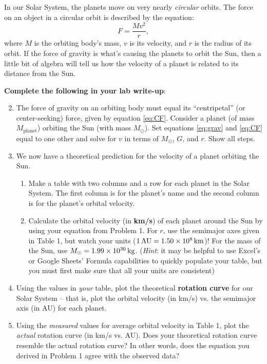 \documentclass[11pt]{article}%
\begin{document}
In our Solar System, the planets move on very nearly \emph{circular} orbits. The force on an object in a circular orbit is described by the equation:
\begin{equation} \label{eq:CF}
F = \frac{M v^2}{r},
\end{equation}
where $M$ is the orbiting body's mass, $v$ is its velocity, and $r$ is the radius of its orbit. If the force of gravity is what's causing the planets to orbit the Sun, then a little bit of algebra will tell us how the velocity of a planet is related to its distance from the Sun.

\textbf{Complete the following in your lab write-up}:

\begin{enumerate}
\setcounter{enumi}{1}
    \item The force of gravity on an orbiting body must equal its ``centripetal'' (or center-seeking) force, given by equation \ref{eq:CF}. Consider a planet (of mass $M_{\textrm{planet}}$) orbiting the Sun (with mass $M_\odot$). Set equations \ref{eq:grav} and \ref{eq:CF} equal to one other and solve for $v$ in terms of $M_{\odot}$, $G$, and $r$. Show all steps.
    
    \item We now have a theoretical prediction for the velocity of a planet orbiting the Sun.
    \begin{enumerate}
        \item Make a table with two columns and a row for each planet in the Solar System. The first column is for the planet's name and the second column is for the planet's orbital velocity. 
        
        \item Calculate the orbital velocity (in \textbf{km/s}) of each planet around the Sun by using your equation from Problem 1. For $r$, use the semimajor axes given in Table 1, but watch your units ($1 \, {\rm AU} = 1.50 \times 10^8 \, {\rm km}$)! For the mass of the Sun, use $M_\odot = 1.99 \times 10^{30} \, {\rm kg}$. (\emph{Hint}: it may be helpful to use Excel's or Google Sheets' Formula capabilities to quickly populate your table, but you must first make sure that all your units are consistent)
    \end{enumerate}
    
    \item Using the values in \emph{your} table, plot the theoretical \textbf{rotation curve} for our Solar System -- that is, plot the orbital velocity (in km/s) vs. the semimajor axis (in AU) for each planet. 
    
    \item Using the \emph{measured} values for average orbital velocity in Table 1, plot the \emph{actual} rotation curve (in km/s vs. AU). Does your theoretical rotation curve resemble the actual rotation curve? In other words, does the equation you derived in Problem 1 agree with the observed data?
\end{enumerate}
\end{document}
